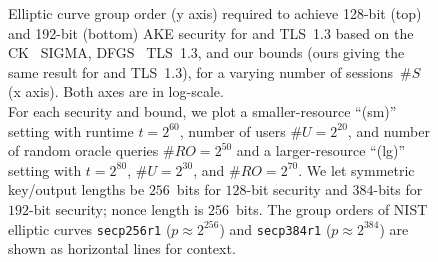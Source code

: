 \begin{figure}[t]
\begin{minipage}{\textwidth}
	\end{minipage}
	\caption[%
		Elliptic curve group order required to achieve 128-bit and 192-bit AKE security for \SIGMA and TLS~1.3
		based on the CK SIGMA, DFGS TLS~1.3, and our bounds.
	]{%
		Elliptic curve group order (y axis) required to achieve 128-bit (top) and 192-bit (bottom) AKE security for \SIGMA and TLS~1.3
		based on the CK~ SIGMA, DFGS~ TLS~1.3, and our bounds (ours giving the same result for \SIGMA and TLS~1.3),
		for a varying number of sessions~$\# S$ (x axis).
		Both axes are in log-scale.\\
		For each security and bound, we plot a smaller-resource ``(sm)'' setting with runtime $t = 2^{60}$, number of users $\# U = 2^{20}$, and number of random oracle queries $\# RO = 2^{50}$ and a larger-resource ``(lg)'' setting with $t = 2^{80}$, $\# U = 2^{30}$, and $\# RO = 2^{70}$.
		We let symmetric key/output lengths be $256$~bits for $128$-bit security and $384$-bits for $192$-bit security; nonce length is $256$~bits. 
		The group orders of NIST elliptic curves \texttt{secp256r1} ($p \approx 2^{256}$) and \texttt{secp384r1} ($p \approx 2^{384}$) are shown as horizontal lines for context.
	}
\end{figure}

